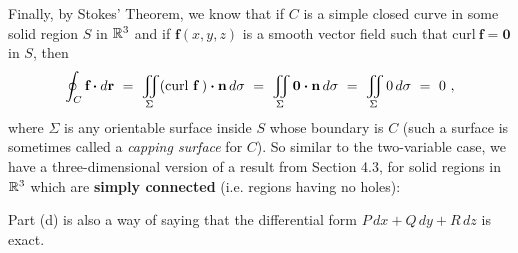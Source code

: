 Finally, by Stokes' Theorem, we know that if $C$ is a simple closed curve in some solid region $S$ in $\mathbb{R}^{3}$ and if
$\mathbf{f}(x,y,z)$ is a smooth vector field such that $\text{curl}~\mathbf{f} = \mathbf{0}$ in $S$, then
\begin{displaymath}
 \oint_{C} \textbf{f} \bm{\cdot} d\textbf{r} ~=~ \iint\limits_{\Sigma} (\text{curl}~{\mathbf{f}}\,) \bm{\cdot} \mathbf{n}\,d\sigma ~=~
   \iint\limits_{\Sigma} \mathbf{0} \bm{\cdot} \mathbf{n}\,d\sigma ~=~ \iint\limits_{\Sigma} 0\,d\sigma ~=~ 0 ~,
\end{displaymath}
where $\Sigma$ is any orientable surface inside $S$ whose boundary is $C$ (such a surface is sometimes called a
\emph{capping surface} for $C$).
So similar to the two-variable case, we have a three-dimensional version of a result from Section 4.3, for solid regions
in $\mathbb{R}^{3}$ which are \textbf{simply connected} (i.e. regions having no holes):

\medskip
{}\medskip

\par\noindent Part (d) is also a way of saying that the differential form $P\,dx + Q\,dy + R\,dz$ is exact.
 
